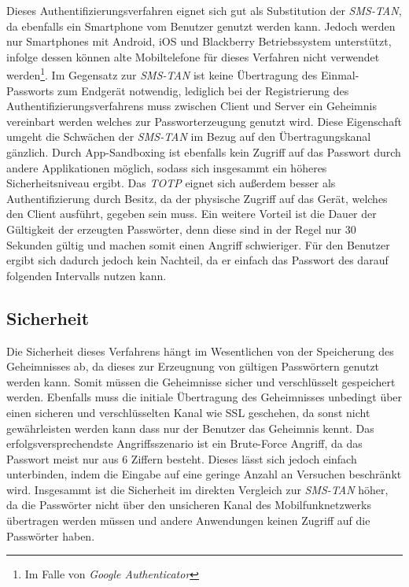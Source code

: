 \documentclass[11pt,a4paper,ngerman]{scrreprt}
\begin{document}
Dieses Authentifizierungsverfahren eignet sich gut als Substitution der \textit{SMS-TAN}, da ebenfalls ein Smartphone vom Benutzer genutzt werden kann. Jedoch werden nur Smartphones mit Android, iOS und Blackberry Betriebssystem unterstützt, infolge dessen können alte Mobiltelefone für dieses Verfahren nicht verwendet werden\footnote{Im Falle von \textit{Google Authenticator}}. Im Gegensatz zur \textit{SMS-TAN} ist keine Übertragung des Einmal-Passworts zum Endgerät notwendig, lediglich bei der Registrierung des Authentifizierungsverfahrens muss zwischen Client und Server ein Geheimnis vereinbart werden welches zur Passworterzeugung genutzt wird. Diese Eigenschaft umgeht die Schwächen der \textit{SMS-TAN} im Bezug auf den Übertragungskanal gänzlich. Durch App-Sandboxing ist ebenfalls kein Zugriff auf das Passwort durch andere Applikationen möglich, sodass sich insgesammt ein höheres Sicherheitsniveau ergibt. Das \textit{TOTP} eignet sich außerdem besser als Authentifizierung durch Besitz, da der physische Zugriff auf das Gerät, welches den Client ausführt, gegeben sein muss. Ein weitere Vorteil ist die Dauer der Gültigkeit der erzeugten Passwörter, denn diese sind in der Regel nur 30 Sekunden gültig und machen somit einen Angriff schwieriger. Für den Benutzer ergibt sich dadurch jedoch kein Nachteil, da er einfach das Passwort des darauf folgenden Intervalls nutzen kann.

\subsection{Sicherheit}
Die Sicherheit dieses Verfahrens hängt im Wesentlichen von der Speicherung des Geheimnisses ab, da dieses zur Erzeugnung von gültigen Passwörtern genutzt werden kann. Somit müssen die Geheimnisse sicher und verschlüsselt gespeichert werden. Ebenfalls muss die initiale Übertragung des Geheimnisses unbedingt über einen sicheren und verschlüsselten Kanal wie SSL geschehen, da sonst nicht gewährleisten werden kann dass nur der Benutzer das Geheimnis kennt. Das erfolgsversprechendste Angriffsszenario ist ein Brute-Force Angriff, da das Passwort meist nur aus 6 Ziffern besteht. Dieses lässt sich jedoch einfach unterbinden, indem die Eingabe auf eine geringe Anzahl an Versuchen beschränkt wird. Insgesammt ist die Sicherheit im direkten Vergleich zur \textit{SMS-TAN} höher, da die Passwörter nicht über den unsicheren Kanal des Mobilfunknetzwerks übertragen werden müssen und andere Anwendungen keinen Zugriff auf die Passwörter haben.
\end{document}
